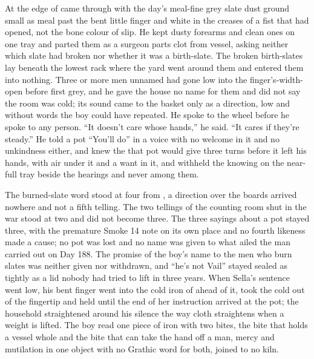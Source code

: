 \scenebreak

At the edge of   came through with the day's meal-fine grey slate dust ground small as meal past the bent little finger and white in the creases of a fist that had opened, not the bone colour of slip. He kept dusty forearms and clean ones on one tray and parted them as a surgeon parts clot from vessel, asking neither which slate had broken nor whether it was a birth-slate. The broken birth-slates lay beneath the lowest rack where the yard went around them and entered them into nothing. Three or more men unnamed had gone low into the finger's-width-open  before first grey, and he gave the house no name for them and did not say the room was cold; its sound came to the basket only as a direction, low and without words the boy could have repeated. He spoke to the wheel before he spoke to any person. “It doesn't care whose hands,” he said. “It cares if they're steady.” He told a pot “You'll do” in a voice with no welcome in it and no unkindness either, and knew the  that pot would give three turns before it left his hands, with air under it and a want in it, and withheld the knowing on the near-full tray beside the hearings and never among them.

The burned-slate word stood at four from , a direction over the boards arrived nowhere and not a fifth telling. The two tellings of the counting room shut in the war stood at two and did not become three. The three sayings about a pot stayed three, with the premature Smoke 14 note on its own place and no fourth likeness made a cause; no pot was lost and no name was given to what ailed the man carried out on Day 188. The promise of the boy's name to the men who burn slates was neither given nor withdrawn, and “he's not Vail” stayed sealed as tightly as a lid nobody had tried to lift in three years. When Sella's sentence went low, his bent finger went into the cold iron of  ahead of it, took the cold out of the fingertip and held until the end of her instruction arrived at the pot; the household straightened around his silence the way cloth straightens when a weight is lifted. The boy read one piece of iron with two bites, the bite that holds a vessel whole and the bite that can take the hand off a man, mercy and mutilation in one object with no Grathic word for both, joined to no kiln.

\scenebreak

